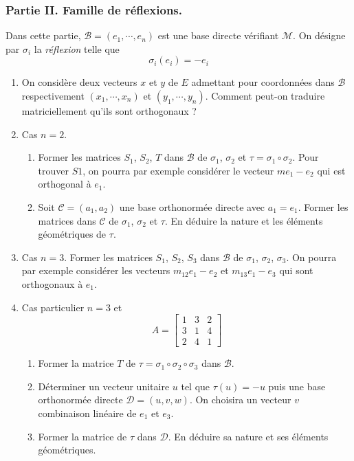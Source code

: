\subsubsection*{Partie II. Famille de réflexions.}
Dans cette partie, $\mathcal B =(e_1,\cdots,e_n)$ est une base directe vérifiant $\mathcal M$.
On désigne par $\sigma_i$ la \emph{réflexion} telle que
\[\sigma_i(e_i)=-e_i\]
\begin{enumerate}
 \item On considère deux vecteurs $x$ et $y$ de $E$ admettant pour coordonnées dans $\mathcal B$ respectivement $(x_1,\cdots,x_n)$ et $(y_1,\cdots,y_n)$. Comment peut-on traduire matriciellement qu'ils sont orthogonaux ?

 \item Cas $n=2$. \begin{enumerate}
 \item Former les matrices $S_1$, $S_2$, $T$ dans $\mathcal B$ de $\sigma_1$, $\sigma_2$ et $\tau=\sigma_1 \circ \sigma_2$. Pour trouver $S1$, on pourra par exemple considérer le vecteur $me_1-e_2$ qui est orthogonal à $e_1$.
\item Soit $\mathcal{C}=(a_1,a_2)$ une base orthonormée directe avec $a_1=e_1$. Former les matrices dans $\mathcal C$ de $\sigma_1$, $\sigma_2$ et $\tau$. En déduire la nature et les éléments géométriques de $\tau$.
\end{enumerate}
\item Cas $n=3$. Former les matrices  $S_1$, $S_2$, $S_3$ dans $\mathcal B$ de $\sigma_1$, $\sigma_2$, $\sigma_3$. On pourra par exemple considérer les vecteurs $m_{12}e_1-e_2$ et $m_{13}e_1-e_3$ qui sont orthogonaux à $e_1$.
\item Cas particulier $n=3$ et
\begin{displaymath}
 A= \begin{bmatrix}
 1 & 3 & 2 \\
3 & 1 & 4 \\
2 & 4 & 1
\end{bmatrix}
\end{displaymath}
\begin{enumerate}
 \item Former la matrice $T$ de $\tau=\sigma_1 \circ \sigma_2 \circ \sigma_3$ dans $\mathcal B$.
 \item Déterminer un vecteur unitaire $u$ tel que $\tau(u)=-u$ puis une base orthonormée directe $\mathcal{D}=(u,v,w)$. On choisira un vecteur $v$ combinaison linéaire de $e_1$ et $e_3$.
 \item Former la matrice de $\tau$ dans $\mathcal D$. En déduire sa nature et ses éléments géométriques.
\end{enumerate}
\end{enumerate}


